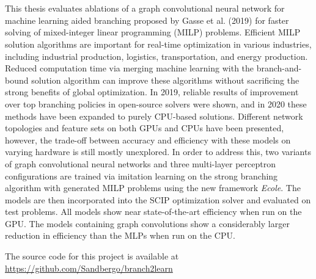 \chapter*{\englishabstractname}
%
This thesis evaluates ablations of a graph convolutional neural network for machine learning aided branching proposed by Gasse et al. (2019)
for faster solving of mixed-integer linear programming (\gls{MILP}) problems. 
Efficient \gls{MILP} solution algorithms are important for real-time optimization in various industries, including industrial production, logistics, transportation, and energy production.  Reduced computation time via merging machine learning with the branch-and-bound solution algorithm can improve these algorithms without sacrificing the strong benefits of global optimization.
In 2019, reliable results of improvement over top branching policies in open-source solvers were shown, and in 2020 these methods have been expanded to purely \gls{CPU}-based solutions. Different network topologies and feature sets on both \gls{GPU}s and \gls{CPU}s have been presented, however, the trade-off between accuracy and efficiency with these models on varying hardware is still mostly unexplored.
In order to address this, two variants of graph convolutional neural networks and three multi-layer perceptron configurations are trained via imitation learning on the strong branching algorithm with generated \gls{MILP} problems using the new framework \textit{\gls{Ecole}}.  The models are then incorporated into the \gls{SCIP} optimization solver and evaluated on test problems. All models show near state-of-the-art efficiency when run on the \gls{GPU}. The models containing graph convolutions show a considerably larger reduction in efficiency than the \gls{MLP}s when run on the \gls{CPU}.

The source code for this project is available at\\ \url{https://github.com/Sandbergo/branch2learn}

%
\clearpage
